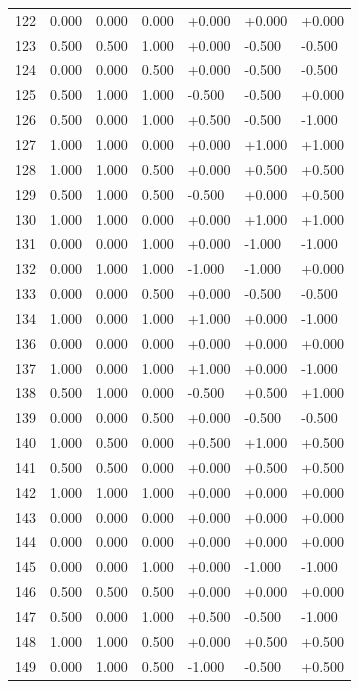 \documentclass[
]{article}
\begin{document}
{\begin{longtable}[]{@{}lllllll@{}}
122 & 0.000 & 0.000 & 0.000 & +0.000 & +0.000 & +0.000 \\
123 & 0.500 & 0.500 & 1.000 & +0.000 & -0.500 & -0.500 \\
124 & 0.000 & 0.000 & 0.500 & +0.000 & -0.500 & -0.500 \\
125 & 0.500 & 1.000 & 1.000 & -0.500 & -0.500 & +0.000 \\
126 & 0.500 & 0.000 & 1.000 & +0.500 & -0.500 & -1.000 \\
127 & 1.000 & 1.000 & 0.000 & +0.000 & +1.000 & +1.000 \\
128 & 1.000 & 1.000 & 0.500 & +0.000 & +0.500 & +0.500 \\
129 & 0.500 & 1.000 & 0.500 & -0.500 & +0.000 & +0.500 \\
130 & 1.000 & 1.000 & 0.000 & +0.000 & +1.000 & +1.000 \\
131 & 0.000 & 0.000 & 1.000 & +0.000 & -1.000 & -1.000 \\
132 & 0.000 & 1.000 & 1.000 & -1.000 & -1.000 & +0.000 \\
133 & 0.000 & 0.000 & 0.500 & +0.000 & -0.500 & -0.500 \\
134 & 1.000 & 0.000 & 1.000 & +1.000 & +0.000 & -1.000 \\
136 & 0.000 & 0.000 & 0.000 & +0.000 & +0.000 & +0.000 \\
137 & 1.000 & 0.000 & 1.000 & +1.000 & +0.000 & -1.000 \\
138 & 0.500 & 1.000 & 0.000 & -0.500 & +0.500 & +1.000 \\
139 & 0.000 & 0.000 & 0.500 & +0.000 & -0.500 & -0.500 \\
140 & 1.000 & 0.500 & 0.000 & +0.500 & +1.000 & +0.500 \\
141 & 0.500 & 0.500 & 0.000 & +0.000 & +0.500 & +0.500 \\
142 & 1.000 & 1.000 & 1.000 & +0.000 & +0.000 & +0.000 \\
143 & 0.000 & 0.000 & 0.000 & +0.000 & +0.000 & +0.000 \\
144 & 0.000 & 0.000 & 0.000 & +0.000 & +0.000 & +0.000 \\
145 & 0.000 & 0.000 & 1.000 & +0.000 & -1.000 & -1.000 \\
146 & 0.500 & 0.500 & 0.500 & +0.000 & +0.000 & +0.000 \\
147 & 0.500 & 0.000 & 1.000 & +0.500 & -0.500 & -1.000 \\
148 & 1.000 & 1.000 & 0.500 & +0.000 & +0.500 & +0.500 \\
149 & 0.000 & 1.000 & 0.500 & -1.000 & -0.500 & +0.500 \\

\end{longtable}}
\end{document}
